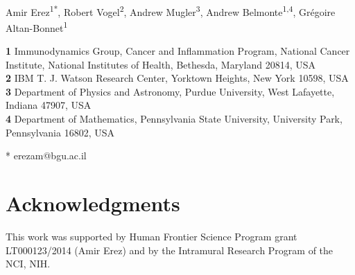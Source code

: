 \documentclass[11pt,a4paper,draft]{article}
\begin{document}
\def\be{\begin{equation}}
\def\ee{\end{equation}}
\def\bea{\begin{eqnarray}}
\def\eea{\end{eqnarray}}
\def\nl{\\ \noindent}
\def\nn{\\ \nonumber}
\def\etal{\emph{et al.} }
\newcommand{\gauss}[3]{e^{-\frac{(#3 - #2)^2}{2\sigma_{#1}^2}}}


\begin{flushleft}
{\Large
\textbf{} %
}
\newline
\\
Amir Erez\textsuperscript{1*},
Robert Vogel\textsuperscript{2},
Andrew Mugler\textsuperscript{3},
Andrew Belmonte\textsuperscript{1,4},
Gr\'egoire Altan-Bonnet\textsuperscript{1}


\bigskip
\textbf{1} Immunodynamics Group, Cancer and Inflammation Program, National Cancer Institute, National Institutes of Health, Bethesda, Maryland 20814, USA
\\
\textbf{2} IBM T. J. Watson Research Center, Yorktown Heights, New York 10598, USA
\\
\textbf{3} Department of Physics and Astronomy, Purdue University, West Lafayette, Indiana 47907, USA
\\
\textbf{4} Department of Mathematics, Pennsylvania State University, University Park, Pennsylvania 16802, USA
\bigskip

* erezam@bgu.ac.il
\end{flushleft}

\section*{Acknowledgments}
This work was supported by Human Frontier Science Program grant LT000123/2014 (Amir Erez) and by the Intramural Research Program of the NCI, NIH.

\newpage 
\end{document}
